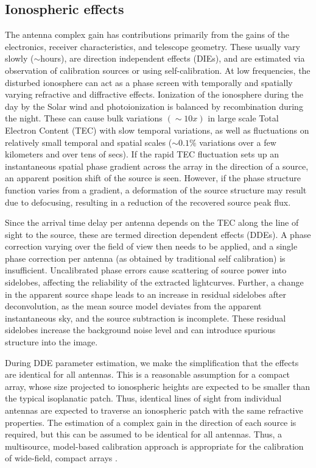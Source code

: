 \documentclass[referee]{aa}
\begin{document}
\subsection{\label{sub:All-Sky-cal-iono}Ionospheric effects}

The  antenna complex  gain has  contributions primarily  from the  gains  of the
electronics, receiver characteristics, and telescope geometry. These usually vary
slowly ($\sim$hours), are direction independent effects (DIEs), and are estimated
via  observation  of calibration  sources  or  using  self-calibration.  At  low
frequencies, the disturbed ionosphere can  act as a phase screen with temporally
and  spatially varying refractive  and diffractive  effects.  Ionization  of the
ionosphere during the day by the  Solar wind and photoionization is balanced by
recombination   during   the   night.    These   can   cause   bulk   variations
$\left(\sim10x\right)$  in large scale  Total Electron  Content (TEC)  with slow
temporal variations,  as well as  fluctuations on relatively small  temporal and
spatial scales  ($\sim0.1\%$ variations over a  few kilometers and  over tens of
secs).   If the rapid  TEC fluctuation  sets up  an instantaneous  spatial phase
gradient across  the array in  the direction of  a source, an  apparent position
shift of  the source is seen.   However, if the phase  structure function varies
from  a gradient,  a  deformation of  the  source structure  may  result due  to
defocusing, resulting in a reduction of the recovered source peak flux.

Since the arrival  time delay per antenna  depends on the TEC along  the line of
sight  to the source,  these are  termed direction  dependent effects  (DDEs). A
phase correction varying over the field of  view then needs to be applied, and a
single  phase   correction  per  antenna   (as  obtained  by   traditional  self
calibration)  is insufficient.   Uncalibrated phase  errors cause  scattering of
source  power  into  sidelobes,  affecting  the  reliability  of  the  extracted
lightcurves.  Further, a change in the apparent source shape leads to an increase
in residual  sidelobes after  deconvolution, as the  mean source  model deviates
from   the  apparent   instantaneous  sky,   and  the   source   subtraction  is
incomplete. These  residual sidelobes increase  the background noise  level and
can introduce spurious structure into the image.


During DDE parameter estimation, we make the simplification that the effects are
identical  for all  antennas.  This  is a  reasonable assumption  for  a compact
array, whose  size projected to ionospheric  heights are expected  to be smaller
than  the  typical  isoplanatic  patch.  Thus, identical  lines  of  sight  from
individual antennas are expected to  traverse an ionospheric patch with the same
refractive properties. The estimation of a complex gain in the direction of each
source  is  required,  but  this  can   be  assumed  to  be  identical  for  all
antennas. Thus, a multisource,  model-based calibration approach is appropriate
for      the      calibration       of      wide-field,      compact      arrays
\citep{wijnholds2010calibration}.
\end{document}
